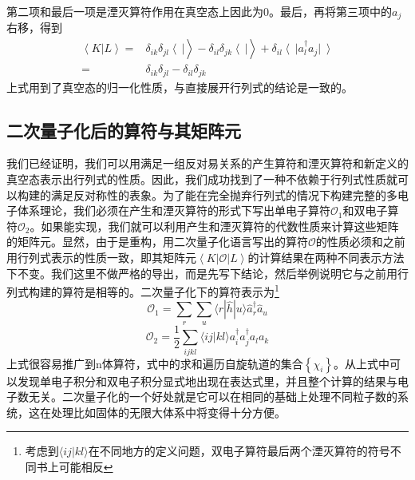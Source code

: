 \documentclass[12pt,a4paper,openany,twoside]{book}
\numberwithin{equation}{section}
\begin{document}
      第二项和最后一项是湮灭算符作用在真空态上因此为0。最后，再将第三项中的$a_j$右移，得到
      \begin{equation}
          \begin{aligned}
              \left\langle K\right|\left.L\right\rangle=&\delta_{ik}\delta_{jl}\left\langle\ \right|\left.\right\rangle
              -\delta_{il}\delta_{jk} \left\langle\ \right|\left.\right\rangle
              +\delta_{il}\left\langle\ \right|a_l^\dagger a_j\left|\ \right\rangle\\
              =&\delta_{ik}\delta_{jl}-\delta_{il}\delta_{jk} 
          \end{aligned}
      \end{equation}
      上式用到了真空态的归一化性质，与直接展开行列式的结论是一致的。
      
    \subsection{二次量子化后的算符与其矩阵元}
      
      我们已经证明，我们可以用满足一组反对易关系的产生算符和湮灭算符和新定义的真空态表示出行列式的性质。因此，我们成功找到了一种不依赖于行列式性质就可以构建的满足反对称性的表象。为了能在完全抛弃行列式的情况下构建完整的多电子体系理论，我们必须在产生和湮灭算符的形式下写出单电子算符$\mathcal{O}_1$和双电子算符$\mathcal{O}_2$。如果能实现，我们就可以利用产生和湮灭算符的代数性质来计算这些矩阵的矩阵元。显然，由于是重构，用二次量子化语言写出的算符$\mathcal{O}$的性质必须和之前用行列式表示的性质一致，即其矩阵元$\left\langle K\right|\mathcal{O}\left|L\right\rangle$的计算结果在两种不同表示方法下不变。我们这里不做严格的导出，而是先写下结论，然后举例说明它与之前用行列式构建的算符是相等的。二次量子化下的算符表示为\footnote{考虑到$\langle i j | k l\rangle$在不同地方的定义问题，双电子算符最后两个湮灭算符的符号不同书上可能相反}
      \begin{equation}
          \mathcal{O}_1=\sum_{r} \sum_{u}\langle r|\hat{h}| u\rangle \hat{a}_{r}^{\dagger} \hat{a}_{u}
      \end{equation}
      \begin{equation}
        \mathcal{O}_{2}=\frac{1}{2} \sum_{i j k l}\langle i j | k l\rangle a_{i}^{\dagger} a_{j}^{\dagger} a_{l} a_{k}
      \end{equation}
      上式很容易推广到n体算符，式中的求和遍历自旋轨道的集合$\left\{\chi_i\right\}$。从上式中可以发现单电子积分和双电子积分显式地出现在表达式里，并且整个计算的结果与电子数无关。二次量子化的一个好处就是它可以在相同的基础上处理不同粒子数的系统，这在处理比如固体的无限大体系中将变得十分方便。
      
\end{document}

